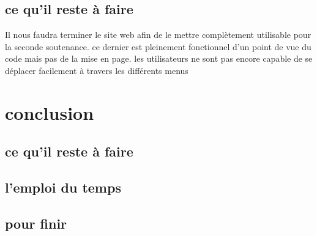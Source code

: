 \documentclass[12pt]{report}
\begin{document}
\section{ce qu'il reste à faire}
Il nous faudra terminer le site web afin de le mettre complètement utilisable pour la seconde soutenance. ce dernier est pleinement fonctionnel d'un point de vue du code mais pas de la mise en page. les utilisateurs ne sont pas encore capable de se déplacer facilement à travers les différents menus
\chapter{conclusion}
\section{ce qu'il reste à faire}
\section{l'emploi du temps}
\section{pour finir}


\end{document}

